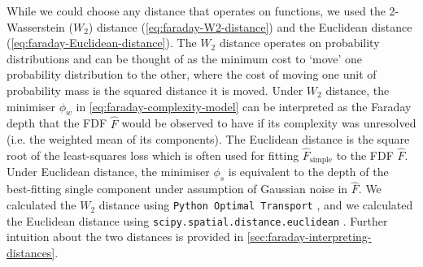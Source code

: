 \documentclass[11pt, a4paper]{book}
\begin{document}
    While we could choose any distance that operates on functions, we used the 2-Wasserstein ($W_2$) distance (\autoref{eq:faraday-W2-distance}) and the Euclidean distance (\autoref{eq:faraday-Euclidean-distance}). The $W_2$ distance operates on probability distributions and can be thought of as the minimum cost to `move' one probability distribution to the other, where the cost of moving one unit of probability mass is the squared distance it is moved. Under $W_2$ distance, the minimiser $\phi_w$ in \autoref{eq:faraday-complexity-model} can be interpreted as the Faraday depth that the FDF $\hat F$ would be observed to have if its complexity was unresolved (i.e. the weighted mean of its components). The Euclidean distance is the square root of the least-squares loss which is often used for fitting $\hat{F}_{\mathrm{simple}}$ to the FDF $\hat F$. Under Euclidean distance, the minimiser $\phi_s$ is equivalent to the depth of the best-fitting single component under assumption of Gaussian noise in $\hat F$.
    We calculated the $W_2$ distance using \texttt{Python Optimal Transport} \citep{flamary17pot}, and we calculated the Euclidean distance using \texttt{scipy.spatial.distance.euclidean} \citep{virtanen20scipy}.
    Further intuition about the two distances is provided in \autoref{sec:faraday-interpreting-distances}.
\end{document}

